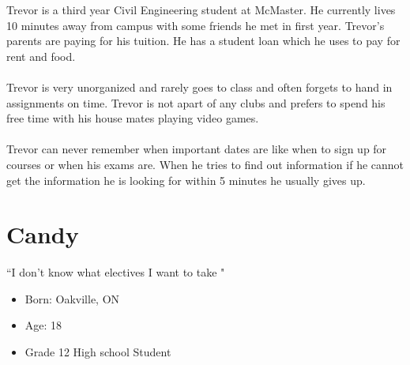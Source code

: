 \documentclass[10pt]{article}
\begin{document}
Trevor is a third year Civil Engineering student at McMaster. He currently lives 10 minutes away from campus with some friends he met in first year. Trevor's parents are paying for his tuition. He has a student loan which he uses to pay for rent and food.\\ \\
Trevor is very unorganized and rarely goes to class and often forgets to hand in assignments on time. Trevor is not apart of any clubs and prefers to spend his free time with his house mates playing video games.\\ \\
Trevor can never remember when important dates are like when to sign up for courses or when his exams are. When he tries to find out information if he cannot get the information he is looking for within 5 minutes he usually gives up.


\newpage


\section{Candy}
\begin{minipage}{0.5\textwidth}
\begin{center}
``I don't know what electives I want to take "
\end{center}
\end{minipage} \hfill
\begin{minipage}{0.45\textwidth}
\begin{itemize}
\item Born: Oakville, ON
\item Age: 18
\item Grade 12 High school Student
\end{itemize}
\end{minipage}\\ \\ \\
\end{document}
